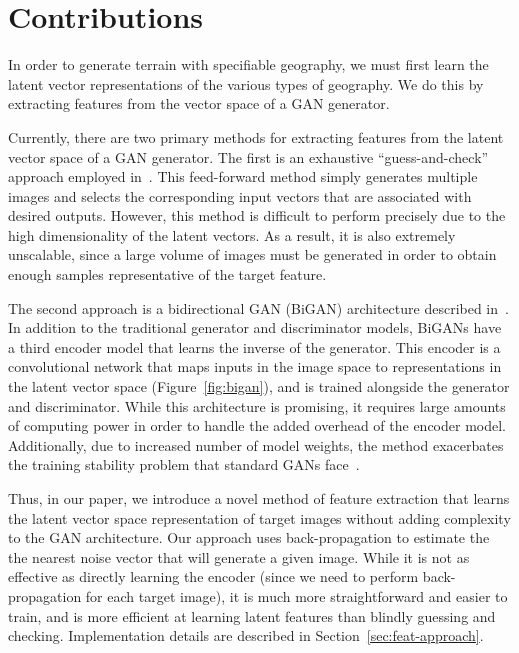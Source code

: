\documentclass[11pt,twocolumn,letterpaper]{article}
\begin{document}
\section{Contributions}

In order to generate terrain with specifiable geography, we must first learn the latent vector representations of the various types of geography. We do this by extracting features from the vector space of a GAN generator.

Currently, there are two primary methods for extracting features from the latent vector space of a GAN generator. The first is an exhaustive ``guess-and-check'' approach employed in~\cite{facebook}. This feed-forward method simply generates multiple images and selects the corresponding input vectors that are associated with desired outputs. However, this method is difficult to perform precisely due to the high dimensionality of the latent vectors. As a result, it is also extremely unscalable, since a large volume of images must be generated in order to obtain enough samples representative of the target feature.

The second approach is a bidirectional GAN (BiGAN) architecture described in~\cite{bigan}. In addition to the traditional generator and discriminator models, BiGANs have a third encoder model that learns the inverse of the generator. This encoder is a convolutional network that maps inputs in the image space to representations in the latent vector space (Figure~\ref{fig:bigan}), and is trained alongside the generator and discriminator. While this architecture is promising, it requires large amounts of computing power in order to handle the added overhead of the encoder model. Additionally, due to increased number of model weights, the method exacerbates the training stability problem that standard GANs face~\cite{stability}.

Thus, in our paper, we introduce a novel method of feature extraction that learns the latent vector space representation of target images without adding complexity to the GAN architecture. Our approach uses back-propagation to estimate the the nearest noise vector that will generate a given image. While it is not as effective as directly learning the encoder (since we need to perform back-propagation for each target image), it is much more straightforward and easier to train, and is more efficient at learning latent features than blindly guessing and checking. Implementation details are described in Section~\ref{sec:feat-approach}.
\end{document}
